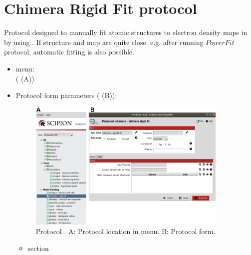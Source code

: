 \section{Chimera Rigid Fit protocol}
\label{app:chimeraRigidFit}%
Protocol designed to manually fit atomic structures to electron density maps in \scipion by using \chimera. If structure and map are quite close, e.g. after running $PowerFit$ protocol, automatic fitting is also possible.
   
 \begin{itemize}
  \item \scipion menu:\\
    ( (A))\\
  
  \item Protocol form parameters ( (B)):\\
  
    \begin{figure}[H]
     \centering 
     \captionsetup{width=.7\linewidth} 
     \includegraphics[width=0.90\textwidth]{Images_appendix/Fig116.pdf}
     \caption{Protocol . A: Protocol location in \scipion menu. B: Protocol form.}
     \label{fig:app_protocol_chimera_1}
    \end{figure}
    
    \begin{itemize}
     \item {} section\\


\end{itemize}
\end{itemize}
